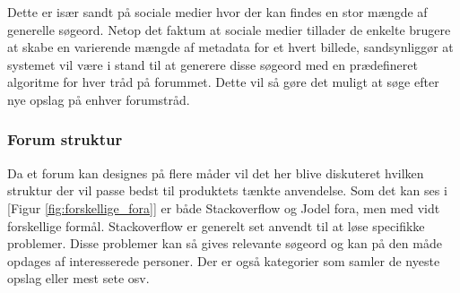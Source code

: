 Dette er især sandt på sociale medier hvor der kan findes en stor mængde af generelle søgeord. Netop det faktum at sociale medier tillader de enkelte brugere at skabe en varierende mængde af metadata for et hvert billede, sandsynliggør at systemet vil være i stand til at generere disse søgeord med en prædefineret algoritme for hver tråd på forummet. Dette vil så gøre det muligt at søge efter nye opslag på enhver forumstråd.

\subsubsection{Forum struktur}
Da et forum kan designes på flere måder vil det her blive diskuteret hvilken struktur der vil passe bedst til produktets tænkte anvendelse. Som det kan ses i [Figur \ref{fig:forskellige_fora}] er både Stackoverflow og Jodel fora, men med vidt forskellige formål. Stackoverflow er generelt set anvendt til at løse specifikke problemer. Disse problemer kan så gives relevante søgeord og kan på den måde opdages af interesserede personer. Der er også kategorier som samler de nyeste opslag eller mest sete osv.

